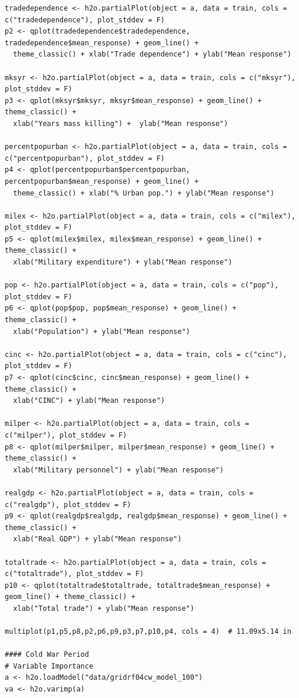 \begin{verbatim}
tradedependence <- h2o.partialPlot(object = a, data = train, cols = c("tradedependence"), plot_stddev = F)
p2 <- qplot(tradedependence$tradedependence, tradedependence$mean_response) + geom_line() +
  theme_classic() + xlab("Trade dependence") + ylab("Mean response")

mksyr <- h2o.partialPlot(object = a, data = train, cols = c("mksyr"), plot_stddev = F)
p3 <- qplot(mksyr$mksyr, mksyr$mean_response) + geom_line() + theme_classic() +
  xlab("Years mass killing") +  ylab("Mean response")

percentpopurban <- h2o.partialPlot(object = a, data = train, cols = c("percentpopurban"), plot_stddev = F)
p4 <- qplot(percentpopurban$percentpopurban, percentpopurban$mean_response) + geom_line() +
  theme_classic() + xlab("% Urban pop.") + ylab("Mean response")

milex <- h2o.partialPlot(object = a, data = train, cols = c("milex"), plot_stddev = F)
p5 <- qplot(milex$milex, milex$mean_response) + geom_line() + theme_classic() +
  xlab("Military expenditure") + ylab("Mean response")

pop <- h2o.partialPlot(object = a, data = train, cols = c("pop"), plot_stddev = F)
p6 <- qplot(pop$pop, pop$mean_response) + geom_line() + theme_classic() +
  xlab("Population") + ylab("Mean response")

cinc <- h2o.partialPlot(object = a, data = train, cols = c("cinc"), plot_stddev = F)
p7 <- qplot(cinc$cinc, cinc$mean_response) + geom_line() + theme_classic() +
  xlab("CINC") + ylab("Mean response")

milper <- h2o.partialPlot(object = a, data = train, cols = c("milper"), plot_stddev = F)
p8 <- qplot(milper$milper, milper$mean_response) + geom_line() + theme_classic() +
  xlab("Military personnel") + ylab("Mean response")

realgdp <- h2o.partialPlot(object = a, data = train, cols = c("realgdp"), plot_stddev = F)
p9 <- qplot(realgdp$realgdp, realgdp$mean_response) + geom_line() + theme_classic() +
  xlab("Real GDP") + ylab("Mean response")

totaltrade <- h2o.partialPlot(object = a, data = train, cols = c("totaltrade"), plot_stddev = F)
p10 <- qplot(totaltrade$totaltrade, totaltrade$mean_response) + geom_line() + theme_classic() +
  xlab("Total trade") + ylab("Mean response")

multiplot(p1,p5,p8,p2,p6,p9,p3,p7,p10,p4, cols = 4)  # 11.09x5.14 in

#### Cold War Period
# Variable Importance
a <- h2o.loadModel("data/gridrf04cw_model_100")
va <- h2o.varimp(a)


\end{verbatim}
